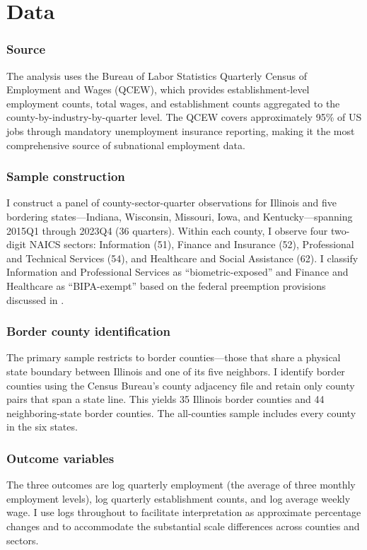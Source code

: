 \documentclass[12pt]{article}
\begin{document}
\section{Data}
\label{sec:data}

\subsubsection*{Source} The analysis uses the Bureau of Labor Statistics Quarterly Census of Employment and Wages (QCEW), which provides establishment-level employment counts, total wages, and establishment counts aggregated to the county-by-industry-by-quarter level. The QCEW covers approximately 95\% of US jobs through mandatory unemployment insurance reporting, making it the most comprehensive source of subnational employment data.

\subsubsection*{Sample construction} I construct a panel of county-sector-quarter observations for Illinois and five bordering states---Indiana, Wisconsin, Missouri, Iowa, and Kentucky---spanning 2015Q1 through 2023Q4 (36 quarters). Within each county, I observe four two-digit NAICS sectors: Information (51), Finance and Insurance (52), Professional and Technical Services (54), and Healthcare and Social Assistance (62). I classify Information and Professional Services as ``biometric-exposed'' and Finance and Healthcare as ``BIPA-exempt'' based on the federal preemption provisions discussed in .

\subsubsection*{Border county identification} The primary sample restricts to border counties---those that share a physical state boundary between Illinois and one of its five neighbors. I identify border counties using the Census Bureau's county adjacency file and retain only county pairs that span a state line. This yields 35 Illinois border counties and 44 neighboring-state border counties. The all-counties sample includes every county in the six states.

\subsubsection*{Outcome variables} The three outcomes are log quarterly employment (the average of three monthly employment levels), log quarterly establishment counts, and log average weekly wage. I use logs throughout to facilitate interpretation as approximate percentage changes and to accommodate the substantial scale differences across counties and sectors.
\end{document}
